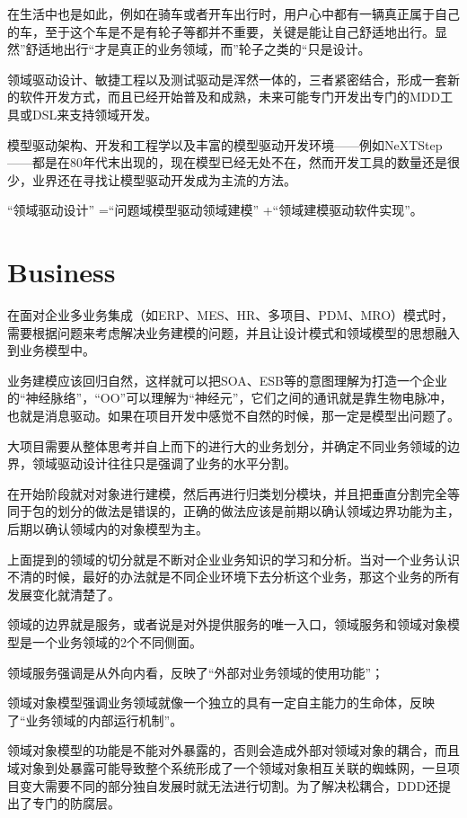 在生活中也是如此，例如在骑车或者开车出行时，用户心中都有一辆真正属于自己的车，至于这个车是不是有轮子等都并不重要，关键是能让自己舒适地出行。显然”舒适地出行“才是真正的业务领域，而”轮子之类的“只是设计。

领域驱动设计、敏捷工程以及测试驱动是浑然一体的，三者紧密结合，形成一套新的软件开发方式，而且已经开始普及和成熟，未来可能专门开发出专门的MDD工具或DSL来支持领域开发。

模型驱动架构、开发和工程学以及丰富的模型驱动开发环境——例如NeXTStep——都是在80年代末出现的，现在模型已经无处不在，然而开发工具的数量还是很少，业界还在寻找让模型驱动开发成为主流的方法。

“领域驱动设计” =“问题域模型驱动领域建模” +“领域建模驱动软件实现”。


\section{Business}


在面对企业多业务集成（如ERP、MES、HR、多项目、PDM、MRO）模式时，需要根据问题来考虑解决业务建模的问题，并且让设计模式和领域模型的思想融入到业务模型中。

业务建模应该回归自然，这样就可以把SOA、ESB等的意图理解为打造一个企业的“神经脉络”，“OO”可以理解为“神经元”，它们之间的通讯就是靠生物电脉冲，也就是消息驱动。如果在项目开发中感觉不自然的时候，那一定是模型出问题了。

大项目需要从整体思考并自上而下的进行大的业务划分，并确定不同业务领域的边界，领域驱动设计往往只是强调了业务的水平分割。

在开始阶段就对对象进行建模，然后再进行归类划分模块，并且把垂直分割完全等同于包的划分的做法是错误的，正确的做法应该是前期以确认领域边界功能为主，后期以确认领域内的对象模型为主。

上面提到的领域的切分就是不断对企业业务知识的学习和分析。当对一个业务认识不清的时候，最好的办法就是不同企业环境下去分析这个业务，那这个业务的所有发展变化就清楚了。

领域的边界就是服务，或者说是对外提供服务的唯一入口，领域服务和领域对象模型是一个业务领域的2个不同侧面。

\begin{compactitem}
\item 领域服务强调是从外向内看，反映了“外部对业务领域的使用功能”；
\item 领域对象模型强调业务领域就像一个独立的具有一定自主能力的生命体，反映了“业务领域的内部运行机制”。
\end{compactitem}

领域对象模型的功能是不能对外暴露的，否则会造成外部对领域对象的耦合，而且域对象到处暴露可能导致整个系统形成了一个领域对象相互关联的蜘蛛网，一旦项目变大需要不同的部分独自发展时就无法进行切割。为了解决松耦合，DDD还提出了专门的防腐层。

